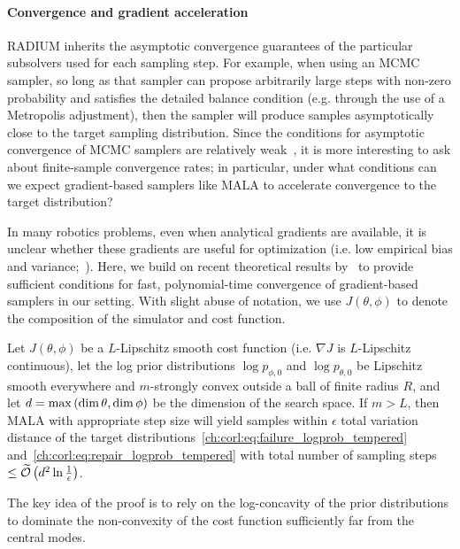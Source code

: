 {\paragraph{Convergence and gradient acceleration}
RADIUM inherits the asymptotic convergence guarantees of the particular subsolvers used for each sampling step. For example, when using an MCMC sampler, so long as that sampler can propose arbitrarily large steps with non-zero probability and satisfies the detailed balance condition (e.g. through the use of a Metropolis adjustment), then the sampler will produce samples asymptotically close to the target sampling distribution. Since the conditions for asymptotic convergence of MCMC samplers are relatively weak~\cite{hastingsMonteCarloSampling1970}, it is more interesting to ask about finite-sample convergence rates; in particular, under what conditions can we expect gradient-based samplers like MALA to accelerate convergence to the target distribution?

In many robotics problems, even when analytical gradients are available, it is unclear whether these gradients are useful for optimization (i.e. low empirical bias and variance;~\cite{suhDifferentiableSimulatorsGive2022}). Here, we build on recent theoretical results by~\cite{maSamplingCanBe2019} to provide sufficient conditions for fast, polynomial-time convergence of gradient-based samplers in our setting. With slight abuse of notation, we use $J(\theta, \phi)$ to denote the composition of the simulator and cost function.

\begin{theorem}\label{ch:corl:thm:convergence}
    Let $J(\theta, \phi)$ be a $L$-Lipschitz smooth cost function (i.e. $\nabla J$ is $L$-Lipschitz continuous), let the log prior distributions $\log p_{\phi ,0}$ and $\log p_{\theta,0}$ be Lipschitz smooth everywhere and $m$-strongly convex outside a ball of finite radius $R$, and let $d = \max\left( \dim{\theta}, \dim{\phi} \right)$ be the dimension of the search space. If $m > L$, then MALA with appropriate step size will yield samples within $\epsilon$ total variation distance of the target distributions~\eqref{ch:corl:eq:failure_logprob_tempered} and~\eqref{ch:corl:eq:repair_logprob_tempered} with total number of sampling steps $\leq \widetilde{\mathcal{O}}\left( d^2 \ln\frac{1}{\epsilon} \right)$.
\end{theorem}

The key idea of the proof is to rely on the log-concavity of the prior distributions to dominate the non-convexity of the cost function sufficiently far from the central modes.

}
